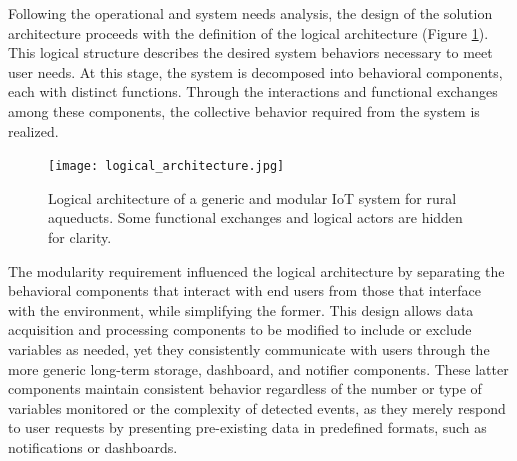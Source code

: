 \documentclass[conference]{IEEEtran}
\begin{document}
Following the operational and system needs analysis, the design of the solution architecture proceeds with the definition of the logical architecture (Figure \ref{fig:la}). This logical structure describes the desired system behaviors necessary to meet user needs. At this stage, the system is decomposed into behavioral components, each with distinct functions. Through the interactions and functional exchanges among these components, the collective behavior required from the system is realized.

\begin{figure}[hbt]
    \centering
    \texttt{[image: logical\_architecture.jpg]}
    \caption{Logical architecture of a generic and modular IoT system for rural aqueducts. Some functional exchanges and logical actors are hidden for clarity.}
    \label{fig:la}
\end{figure}

The modularity requirement influenced the logical architecture by separating the behavioral components that interact with end users from those that interface with the environment, while simplifying the former. This design allows data acquisition and processing components to be modified to include or exclude variables as needed, yet they consistently communicate with users through the more generic long-term storage, dashboard, and notifier components. These latter components maintain consistent behavior regardless of the number or type of variables monitored or the complexity of detected events, as they merely respond to user requests by presenting pre-existing data in predefined formats, such as notifications or dashboards.
\end{document}
